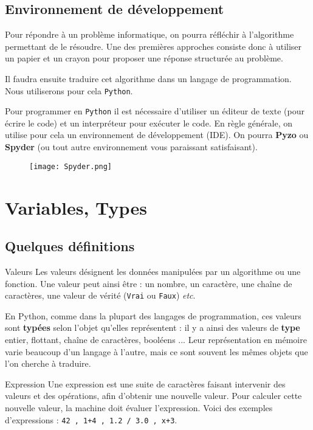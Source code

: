 \subsection{Environnement de développement}
Pour répondre à un problème informatique, on pourra réfléchir à l'algorithme permettant de le résoudre. Une des premières approches consiste donc à utiliser un papier et un crayon pour proposer une réponse structurée au problème.

Il faudra ensuite traduire cet algorithme dans un langage de programmation. Nous utiliserons pour cela \texttt{Python}.

Pour programmer en \texttt{Python} il est nécessaire d'utiliser un éditeur de texte (pour écrire le code) et un interpréteur pour exécuter le code. 
En règle générale, on utilise pour cela un environnement de développement (IDE). On pourra \textbf{Pyzo} ou \textbf{Spyder} (ou tout autre environnement vous paraissant satisfaisant). 

\begin{figure}[H]
\centering
\texttt{[image: Spyder.png]}
\end{figure}

\section{Variables, Types}

\subsection{Quelques définitions}
\begin{defi}{Valeurs}
Les valeurs désignent les données manipulées par un algorithme ou une fonction. Une valeur 
peut ainsi être  : un nombre, un caractère, une chaîne de caractères, une valeur de vérité 
(\texttt{Vrai} ou \texttt{Faux}) \textit{etc}.

En Python, comme dans la plupart des langages de programmation, ces valeurs sont \textbf{typées} selon l'objet qu'elles représentent : il y a ainsi des valeurs de \textbf{type} entier, flottant, chaîne de caractères, booléens ...   Leur représentation en mémoire varie beaucoup d'un langage à l'autre, mais ce sont souvent les mêmes objets que l'on 
cherche à traduire.
\end{defi}

\begin{defi}{Expression }
Une expression est une suite de caractères faisant intervenir des valeurs et des 
opérations, afin d'obtenir une nouvelle valeur. Pour calculer cette nouvelle valeur,
la machine doit {évaluer} l'expression. Voici des exemples d'expressions : \texttt{42 , 1+4 , 
1.2 / 3.0 , x+3}.

\end{defi}


